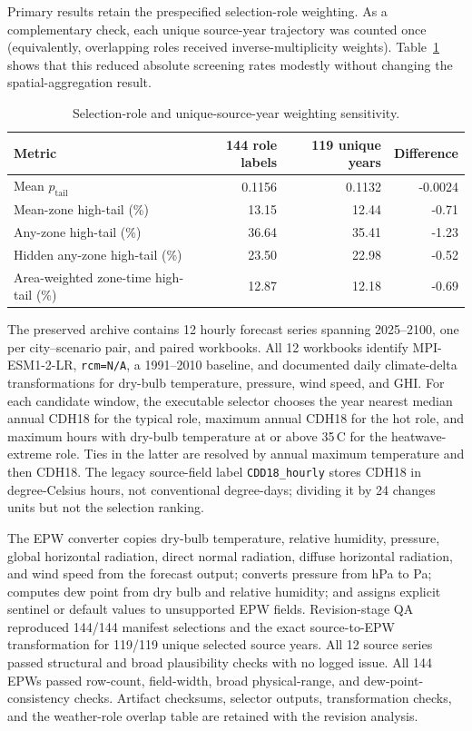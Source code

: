 \documentclass[11pt]{article}
\begin{document}
Primary results retain the prespecified selection-role weighting. As a complementary check, each unique source-year trajectory was counted once (equivalently, overlapping roles received inverse-multiplicity weights). Table~\ref{tab:supp_unique_weather} shows that this reduced absolute screening rates modestly without changing the spatial-aggregation result.

\begin{table}[htbp]
\centering
\caption{Selection-role and unique-source-year weighting sensitivity.}
\label{tab:supp_unique_weather}
\footnotesize
\begin{tabular}{lrrr}
\toprule
Metric & 144 role labels & 119 unique years & Difference \\
\midrule
Mean $p_{\mathrm{tail}}$ & 0.1156 & 0.1132 & -0.0024 \\
Mean-zone high-tail (\%) & 13.15 & 12.44 & -0.71 \\
Any-zone high-tail (\%) & 36.64 & 35.41 & -1.23 \\
Hidden any-zone high-tail (\%) & 23.50 & 22.98 & -0.52 \\
Area-weighted zone-time high-tail (\%) & 12.87 & 12.18 & -0.69 \\
\bottomrule
\end{tabular}
\end{table}

The preserved archive contains 12 hourly forecast series spanning 2025--2100, one per city--scenario pair, and paired workbooks. All 12 workbooks identify MPI-ESM1-2-LR, \texttt{rcm=N/A}, a 1991--2010 baseline, and documented daily climate-delta transformations for dry-bulb temperature, pressure, wind speed, and GHI. For each candidate window, the executable selector chooses the year nearest median annual CDH18 for the typical role, maximum annual CDH18 for the hot role, and maximum hours with dry-bulb temperature at or above 35\,\degree C for the heatwave-extreme role. Ties in the latter are resolved by annual maximum temperature and then CDH18. The legacy source-field label \texttt{CDD18\_hourly} stores CDH18 in degree-Celsius hours, not conventional degree-days; dividing it by 24 changes units but not the selection ranking.

The EPW converter copies dry-bulb temperature, relative humidity, pressure, global horizontal radiation, direct normal radiation, diffuse horizontal radiation, and wind speed from the forecast output; converts pressure from hPa to Pa; computes dew point from dry bulb and relative humidity; and assigns explicit sentinel or default values to unsupported EPW fields. Revision-stage QA reproduced 144/144 manifest selections and the exact source-to-EPW transformation for 119/119 unique selected source years. All 12 source series passed structural and broad plausibility checks with no logged issue. All 144 EPWs passed row-count, field-width, broad physical-range, and dew-point-consistency checks. Artifact checksums, selector outputs, transformation checks, and the weather-role overlap table are retained with the revision analysis.
\end{document}

